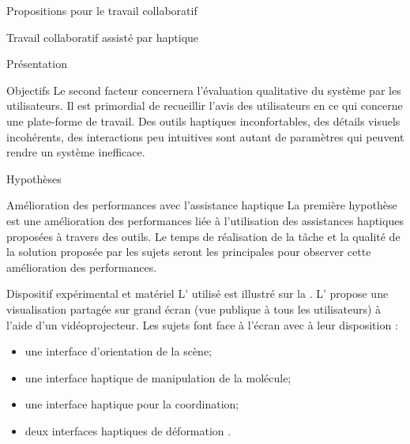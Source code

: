 \documentclass[myfrancais]{mythesis}
\begin{document}
\begin{mypart}{Propositions pour le travail collaboratif}
\begin{mychapter}{Travail collaboratif assisté par haptique}
\begin{mysection}{Présentation}
\begin{mysubsection}{Objectifs}
					Le second facteur concernera l'évaluation qualitative du système par les utilisateurs.
					Il est primordial de recueillir l'avis des utilisateurs en ce qui concerne une plate-forme de travail.
					Des outils haptiques inconfortables, des détails visuels incohérents, des interactions peu intuitives sont autant de paramètres qui peuvent rendre un système inefficace.
				\end{mysubsection}
				\begin{mysubsection}{Hypothèses}
					\begin{myparagraph}{ Amélioration des performances avec l'assistance haptique}
						La première hypothèse est une amélioration des performances liée à l'utilisation des assistances haptiques proposées à travers des outils.
						Le temps de réalisation de la tâche et la qualité de la solution proposée par les sujets seront les  principales pour observer cette amélioration des performances.
					\end{myparagraph}
				\end{mysubsection}
			\end{mysection}
			\begin{mysection}{Dispositif expérimental et matériel}
				L' utilisé est illustré sur la .
				L' propose une visualisation partagée sur grand écran (vue publique à tous les utilisateurs) à l'aide d'un vidéoprojecteur.
				Les  sujets font face à l'écran avec à leur disposition :
				\begin{itemize}
					\item une interface d'orientation de la scène;
					\item une interface haptique de manipulation de la molécule;
					\item une interface haptique pour la coordination;
					\item deux interfaces haptiques de déformation .
				\end{itemize}


\end{mysection}
\end{mychapter}
\end{mypart}
\end{document}
